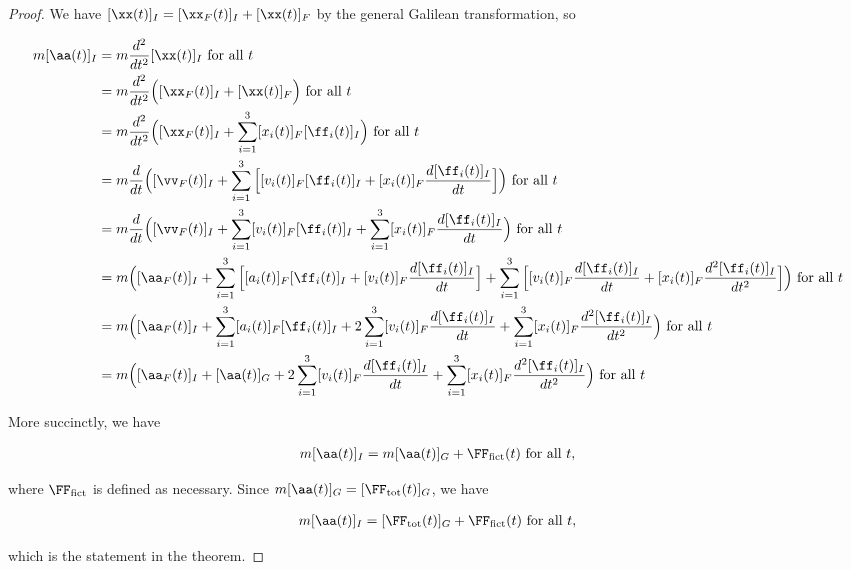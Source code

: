 \documentclass{article}
\begin{document}
\begin{proof}
	We have $[\xx(t)]_I = [\xx_F(t)]_I + [\xx(t)]_F$ by the general Galilean transformation, so 
	
	\begin{align*}
		m[\aa(t)]_I &= m \frac{d^2}{dt^2}[\xx(t)]_I \text{ for all $t$} \\
		&= m \frac{d^2}{dt^2}\Big([\xx_{F}(t)]_I + [\xx(t)]_F \Big) \text{ for all $t$}
		\\
		&= m \frac{d^2}{dt^2}\Big([\xx_{F}(t)]_I + \sum_{i = 1}^3 [x_i(t)]_F [\ff_i(t)]_I \Big) \text{ for all $t$} \\
		&= m \frac{d}{dt}\Big([\vv_F(t)]_I + \sum_{i = 1}^3  \Big[[v_i(t)]_F [\ff_i(t)]_I + [x_i(t)]_F \frac{d [\ff_i(t)]_I}{dt}\Big]\Big) \text{ for all $t$} \\
		&= m \frac{d}{dt}\Big([\vv_F(t)]_I + \sum_{i = 1}^3  [v_i(t)]_F [\ff_i(t)]_I + \sum_{i = 1}^3 [x_i(t)]_F \frac{d [\ff_i(t)]_I}{dt}\Big) \text{ for all $t$} \\
		&= m \Big([\aa_F(t)]_I + \sum_{i = 1}^3  \Big[ [a_i(t)]_F [\ff_i(t)]_I + [v_i(t)]_F \frac{d[\ff_i(t)]_I}{dt}\Big] + \sum_{i = 1}^3 \Big[ [v_i(t)]_F \frac{d [\ff_i(t)]_I}{dt} + [x_i(t)]_F \frac{d^2 [\ff_i(t)]_I}{dt^2} \Big]\Big) \text{ for all $t$} \\
		&= m \Big([\aa_F(t)]_I + \sum_{i = 1}^3 [a_i(t)]_F [\ff_i(t)]_I +
		2 \sum_{i = 1}^3 [v_i(t)]_F \frac{d[\ff_i(t)]_I}{dt} + \sum_{i = 1}^3 [x_i(t)]_F \frac{d^2 [\ff_i(t)]_I}{dt^2} \Big) \text{ for all $t$} \\
		&= m \Big([\aa_F(t)]_I + [\aa(t)]_G +
		2 \sum_{i = 1}^3 [v_i(t)]_F \frac{d[\ff_i(t)]_I}{dt} + \sum_{i = 1}^3 [x_i(t)]_F \frac{d^2 [\ff_i(t)]_I}{dt^2} \Big) \text{ for all $t$} 
	\end{align*}
	
	More succinctly, we have 
	
	\begin{align*}
		m[\aa(t)]_I = m[\aa(t)]_G + \FF_{\text{fict}}(t) \text{ for all $t$},
	\end{align*}
	
	where $\FF_{\text{fict}}$ is defined as necessary. Since $m[\aa(t)]_G = [\FF_{\text{tot}}(t)]_G$, we have
	
	\begin{align*}
		m[\aa(t)]_I = [\FF_{\text{tot}}(t)]_G + \FF_{\text{fict}}(t) \text{ for all $t$},
	\end{align*}
	
	which is the statement in the theorem.
\end{proof}
\end{document}
